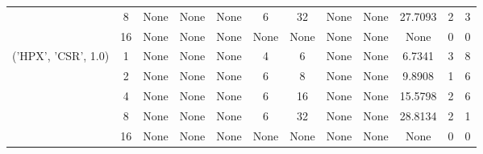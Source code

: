 \begin{tabular}{cccccccccccc}
& 8& None& None& None& 6& 32& None& None& 27.7093& 2& 3\\
& 16& None& None& None& None& None& None& None& None& 0& 0\\
\hline
\multirow{5}{*}{('HPX', 'CSR', 1.0)}& 1& None& None& None& 4& 6& None& None& 6.7341& 3& 8\\
& 2& None& None& None& 6& 8& None& None& 9.8908& 1& 6\\
& 4& None& None& None& 6& 16& None& None& 15.5798& 2& 6\\
& 8& None& None& None& 6& 32& None& None& 28.8134& 2& 1\\
& 16& None& None& None& None& None& None& None& None& 0& 0\\
\hline
\end{tabular}

